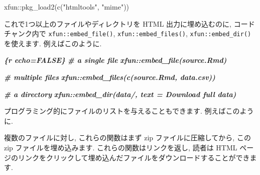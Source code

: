 \documentclass[
  11pt,
]{bxjsreport}
\newenvironment{Shaded}{\begin{snugshade}}{\end{snugshade}}
\newcommand{\CommentTok}[1]{\textcolor[rgb]{0.56,0.35,0.01}{\textit{#1}}}
\newcommand{\FunctionTok}[1]{\textcolor[rgb]{0.00,0.00,0.00}{#1}}
\newcommand{\InformationTok}[1]{\textcolor[rgb]{0.56,0.35,0.01}{\textbf{\textit{#1}}}}
\newcommand{\NormalTok}[1]{#1}
\newcommand{\SpecialCharTok}[1]{\textcolor[rgb]{0.00,0.00,0.00}{#1}}
\newcommand{\StringTok}[1]{\textcolor[rgb]{0.31,0.60,0.02}{#1}}
\begin{document}
\begin{Shaded}
\begin{Highlighting}[numbers=left,,]
\NormalTok{xfun}\SpecialCharTok{::}\FunctionTok{pkg\_load2}\NormalTok{(}\FunctionTok{c}\NormalTok{(}\StringTok{"htmltools"}\NormalTok{, }\StringTok{"mime"}\NormalTok{))}
\end{Highlighting}
\end{Shaded}

これで1つ以上のファイルやディレクトリを HTML 出力に埋め込むのに, コードチャンク内で \texttt{xfun::embed\_file()}, \texttt{xfun::embed\_files()}, \texttt{xfun::embed\_dir()} を使えます. 例えばこのように.

\begin{Shaded}
\begin{Highlighting}[]
\InformationTok{\textasciigrave{}\textasciigrave{}\textasciigrave{}\{r echo=FALSE\}}
\InformationTok{\# a single file}
\InformationTok{xfun::embed\_file(\textquotesingle{}source.Rmd\textquotesingle{})}

\InformationTok{\# multiple files}
\InformationTok{xfun::embed\_files(c(\textquotesingle{}source.Rmd\textquotesingle{}, \textquotesingle{}data.csv\textquotesingle{}))}

\InformationTok{\# a directory}
\InformationTok{xfun::embed\_dir(\textquotesingle{}data/\textquotesingle{}, text = \textquotesingle{}Download full data\textquotesingle{})}
\InformationTok{\textasciigrave{}\textasciigrave{}\textasciigrave{}}
\end{Highlighting}
\end{Shaded}

プログラミング的にファイルのリストを与えることもできます. 例えばこのように.

\begin{Shaded}
\end{Shaded}

複数のファイルに対し, これらの関数はまず zip ファイルに圧縮してから, この zip ファイルを埋め込みます. これらの関数はリンクを返し, 読者は HTML ページのリンクをクリックして埋め込んだファイルをダウンロードすることができます.
\end{document}
